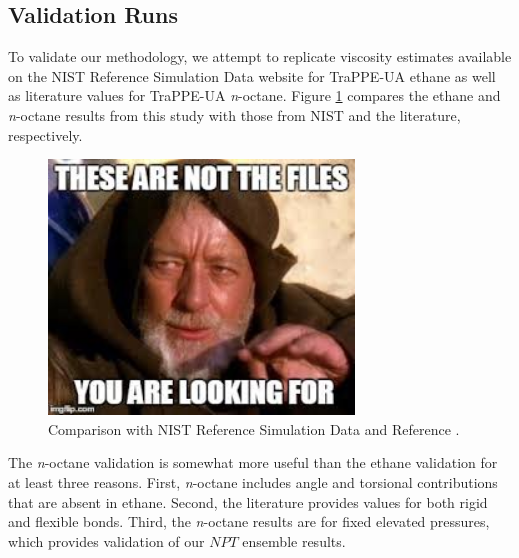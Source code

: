 \documentclass[preprint,review,12pt]{elsarticle}
\begin{document}
	
	\subsection{Validation Runs}
	
    To validate our methodology, we attempt to replicate viscosity estimates available on the NIST Reference Simulation Data website for TraPPE-UA ethane as well as literature values for TraPPE-UA \textit{n}-octane. Figure \ref{fig:validation_runs} compares the ethane and \textit{n}-octane results from this study with those from NIST and the literature, respectively.   
    
    \begin{figure}[htb!]
    	\centering
    	\includegraphics[width=3.2in]{empty_figure.jpg}
    	\caption{Comparison with NIST Reference Simulation Data and Reference .}
    	\label{fig:validation_runs}
    \end{figure} 
    
    The \textit{n}-octane validation is somewhat more useful than the ethane validation for at least three reasons. First, \textit{n}-octane includes angle and torsional contributions that are absent in ethane. Second, the literature provides values for both rigid and flexible bonds. Third, the \textit{n}-octane results are for fixed elevated pressures, which provides validation of our $NPT$ ensemble results.
    
%	
	
\end{document}
